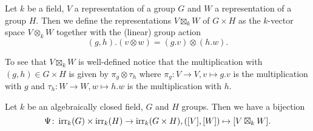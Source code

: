 \begin{defi}
  Let $k$ be a field, $V$ a representation of a group $G$ and $W$ a representation of a group $H$. Then we define the representations $V \boxtimes_k W$ of $G \times H$ as the $k$-vector space $V \otimes_k W$ together with the (linear) group action
  \[
    (g,h).(v \otimes w) = (g.v) \otimes (h.w).
  \]
\end{defi}


To see that $V \boxtimes_k W$ is well-defined notice that the multiplication with $(g,h) \in G \times H$ is given by $\pi_g \otimes \tau_h$ where $\pi_g \colon V \to V, v \mapsto g.v$ is the multiplication with $g$ and $\tau_h \colon W \to W, w \mapsto h.w$ is the multiplication with $h$.


\begin{thrm}
  Let $k$ be an algebraically closed field, $G$ and $H$ groups. Then we have a bijection
  \[
    \Psi \colon \operatorname{irr}_k(G) \times \operatorname{irr}_k(H) \to \operatorname{irr}_k(G \times H), ([V],[W]) \mapsto [V \boxtimes_k W].
  \]
\end{thrm}
